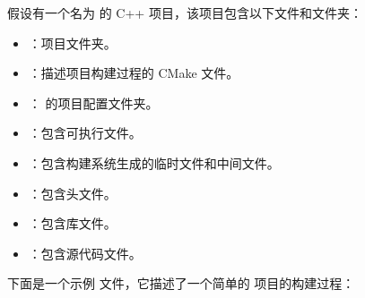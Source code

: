 \documentclass[a4paper,12pt,english]{sphinxmanual}
\begin{document}
\sphinxAtStartPar
假设有一个名为  的 C++ 项目，该项目包含以下文件和文件夹：
\begin{itemize}
\item {} 
\sphinxAtStartPar
{}：项目文件夹。

\item {} 
\sphinxAtStartPar
{}：描述项目构建过程的 CMake 文件。

\item {} 
\sphinxAtStartPar
{}： 的项目配置文件夹。

\item {} 
\sphinxAtStartPar
{}：包含可执行文件。

\item {} 
\sphinxAtStartPar
{}：包含构建系统生成的临时文件和中间文件。

\item {} 
\sphinxAtStartPar
{}：包含头文件。

\item {} 
\sphinxAtStartPar
{}：包含库文件。

\item {} 
\sphinxAtStartPar
{}：包含源代码文件。

\end{itemize}

\sphinxAtStartPar
下面是一个示例 文件，它描述了一个简单的  项目的构建过程：
\end{document}
